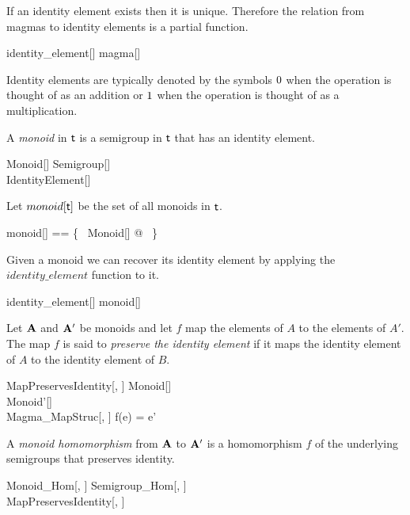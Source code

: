 \documentclass{amsart}
\begin{document}
\begin{remark}
If an identity element exists then it is unique.
Therefore the relation from magmas to identity elements is a partial function.

\begin{zed}
identity\_element[\setT] \in magma[\setT] \pfun \setT
\end{zed}

\end{remark}

Identity elements are typically denoted by the symbols  $0$ when the operation is thought of as an addition
or $1$ when the operation is thought of as a multiplication.

A \textit{monoid} in $\mathsf{t}$ is a semigroup in $\mathsf{t}$ that has an identity element.
\begin{schema}{Monoid}[\genT]
	Semigroup[\genT] \\
	IdentityElement[\genT]
\end{schema}

Let $monoid[\mathsf{t}]$ be the set of all monoids in $\mathsf{t}$.
\begin{zed}
	monoid[\genT] == \{~ Monoid[\genT] @ \strucA ~\}
\end{zed}

\begin{remark}
Given a monoid we can recover its identity element by applying the $identity\_element$
function to it.

\begin{zed}
	identity\_element[\setT] \in monoid[\setT] \fun \setT
\end{zed}

\end{remark}

Let $\mathbf{A}$ and $\mathbf{A}'$ be monoids and let $f$ map the elements of $A$ to the elements of $A'$.
The map $f$ is said to {\em preserve the identity element} if it maps the identity element of $A$
to the identity element of $B$.
\begin{schema}{MapPreservesIdentity}[\genT, \genU]
	Monoid[\genT] \\
	Monoid'[\genU] \\
	Magma\_MapStruc[\genT, \genU]
\where
	f(e) = e'
\end{schema}

A {\em monoid homomorphism} from $\mathbf{A}$ to $\mathbf{A}'$ is a homomorphism $f$ of the underlying semigroups
that preserves identity.

\begin{schema}{Monoid\_Hom}[\genT, \genU]
	Semigroup\_Hom[\genT, \genU] \\
	 MapPreservesIdentity[\genT, \genU]
\end{schema}
\end{document}
